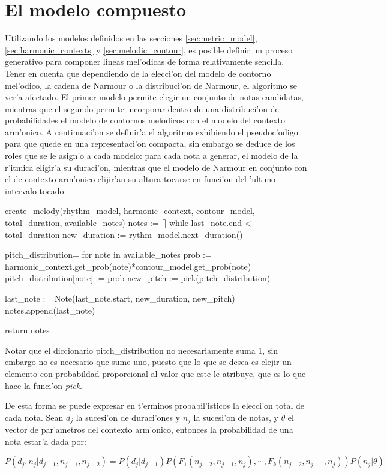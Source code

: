 \section{El modelo compuesto}
Utilizando los modelos definidos en las secciones \ref{sec:metric_model}, \ref{sec:harmonic_contexts} y \ref{sec:melodic_contour}, es posible definir
un proceso generativo para componer lineas mel'odicas de forma relativamente sencilla. 
Tener en cuenta que dependiendo de la elecci'on del modelo de contorno mel'odico, la cadena de Narmour o la distribuci'on de Narmour, el algoritmo se ver'a
afectado. El primer modelo permite elegir un conjunto de notas candidatas, mientras que el segundo permite incorporar dentro de una distribuci'on de 
probabilidades el modelo de contornos melodicos con el modelo del contexto arm'onico. 
A continuaci'on se definir'a el algoritmo exhibiendo el pseudoc'odigo para que quede en una representaci'on compacta, 
sin embargo se deduce de los roles que se le asign'o a cada modelo: 
para cada nota a generar, el modelo de la r'itmica eligir'a su duraci'on, mientras que el modelo de Narmour en conjunto con el de contexto arm'onico 
elijir'an su altura tocarse en funci'on del 'ultimo intervalo tocado.

\begin{algoritmo}
create_melody(rhythm_model, harmonic_context, contour_model, total_duration, available_notes)
    notes := []
    while last_note.end < total_duration
        new_duration := rythm_model.next_duration()

        pitch_distribution= {}
        for note in available_notes
            prob := harmonic_context.get_prob(note)*contour_model.get_prob(note)
            pitch_distribution[note] := prob 
        new_pitch := pick(pitch_distribution)

        last_note := Note(last_note.start, new_duration, new_pitch)
        notes.append(last_note) 

    return notes
\end{algoritmo}

Notar que el diccionario pitch\_distribution no necesariamente suma 1, sin embargo no es necesario que sume uno, puesto que lo que se desea es elejir un elemento con
probabildad proporcional al valor que este le atribuye, que es lo que hace la funci'on \emph{pick}.

De esta forma se puede expresar en t'erminos probabil'isticos la elecci'on total de cada nota. Sean $d_j$ la sucesi'on de duraci'ones y $n_j$ 
la sucesi'on de notas, y $\theta$ el vector de par'ametros del contexto arm'onico, entonces la probabilidad de una nota estar'a dada por:

$$P(d_j, n_j | d_{j-1}, n_{j-1}, n_{j-2}) = P(d_j|d_{j-1})P(F_1(n_{j-2}, n_{j-1}, n_j), \cdots, F_k(n_{j-2}, n_{j-1}, n_j)) P(n_j | \theta)$$

